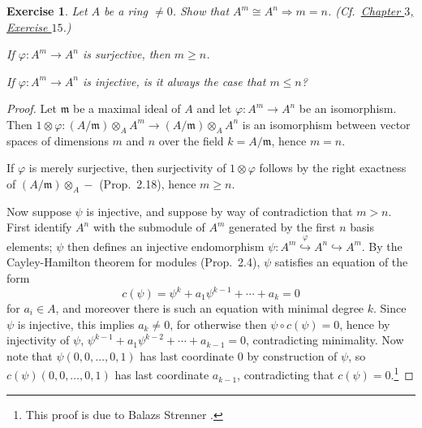 \documentclass[12pt,letterpaper]{article}
\newtheorem{problem}{Exercise}[section]
\theoremstyle{definition}
\theoremstyle{remark}
\numberwithin{figure}{problem}
\numberwithin{equation}{section}
\begin{document}
\begin{problem}
  Let $A$ be a ring $\ne 0$. Show that $A^m \cong A^n \Rightarrow m = n$. (Cf.~\href{AM 3 Rings and Modules of Fractions.pdf#exc:3.15}{Chapter $3$, Exercise $15$}.)
  \par If $\varphi\colon A^m \to A^n$ is surjective, then $m \ge n$.
  \par If $\varphi\colon A^m \to A^n$ is injective, is it always the case that $m \le n$?
\end{problem}
\begin{proof}
  Let $\mathfrak{m}$ be a maximal ideal of $A$ and let $\varphi\colon A^m \to A^n$ be an isomorphism. Then $1 \otimes \varphi\colon (A/\mathfrak{m}) \otimes_A A^m \to (A/\mathfrak{m}) \otimes_A A^n$ is an isomorphism between vector spaces of dimensions $m$ and $n$ over the field $k = A/\mathfrak{m}$, hence $m=n$.
  \par If $\varphi$ is merely surjective, then surjectivity of $1 \otimes \varphi$ follows by the right exactness of $(A/\mathfrak{m}) \otimes_A -$ (Prop.~2.18), hence $m \ge n$.
  \par Now suppose $\psi$ is injective, and suppose by way of contradiction that $m > n$. First identify $A^n$ with the submodule of $A^m$ generated by the first $n$ basis elements; $\psi$ then defines an injective endomorphism $\psi \colon A^m \overset{\varphi}{\hookrightarrow} A^n \hookrightarrow A^m$. By the Cayley-Hamilton theorem for modules (Prop.~2.4), $\psi$ satisfies an equation of the form
  \begin{equation*}
    c(\psi) = \psi^k + a_{1}\psi^{k-1} + \cdots + a_k = 0
  \end{equation*}
  for $a_i \in A$, and moreover there is such an equation with minimal degree $k$. Since $\psi$ is injective, this implies $a_k \ne 0$, for otherwise then $\psi \circ c(\psi) = 0$, hence by injectivity of $\psi$, $\psi^{k-1} + a_{1}\psi^{k-2} + \cdots + a_{k-1} = 0$, contradicting minimality. Now note that $\psi(0,0,\ldots,0,1)$ has last coordinate $0$ by construction of $\psi$, so $c(\psi)(0,0,\ldots,0,1)$ has last coordinate $a_{k-1}$, contradicting that $c(\psi) = 0$.\footnote{This proof is due to Balazs Strenner \cite{MO47846}.}
\end{proof}
\end{document}
